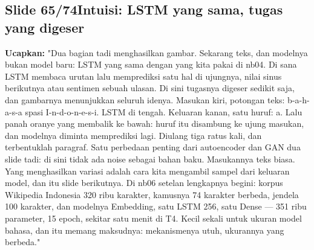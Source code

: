 \documentclass[11pt]{article}
\renewcommand{\framebox}[1]{\colorbox{acc!15}{\textcolor{acc}{\textbf{#1}}}}
\begin{document}
\subsection*{\framebox{Slide 65/74}\quad Intuisi: LSTM yang sama, tugas yang digeser}
\textbf{Ucapkan:} "Dua bagian tadi menghasilkan gambar. Sekarang teks, dan modelnya bukan model baru: LSTM yang sama dengan yang kita pakai di nb04. Di sana LSTM membaca urutan lalu memprediksi satu hal di ujungnya, nilai sinus berikutnya atau sentimen sebuah ulasan. Di sini tugasnya digeser sedikit saja, dan gambarnya menunjukkan seluruh idenya. Masukan kiri, potongan teks: b-a-h-a-s-a spasi I-n-d-o-n-e-s-i. LSTM di tengah. Keluaran kanan, satu huruf: a. Lalu panah oranye yang membalik ke bawah: huruf itu disambung ke ujung masukan, dan modelnya diminta memprediksi lagi. Diulang tiga ratus kali, dan terbentuklah paragraf. Satu perbedaan penting dari autoencoder dan GAN dua slide tadi: di sini tidak ada noise sebagai bahan baku. Masukannya teks biasa. Yang menghasilkan variasi adalah cara kita mengambil sampel dari keluaran model, dan itu slide berikutnya. Di nb06 setelan lengkapnya begini: korpus Wikipedia Indonesia 320 ribu karakter, kamusnya 74 karakter berbeda, jendela 100 karakter, dan modelnya Embedding, satu LSTM 256, satu Dense --- 351 ribu parameter, 15 epoch, sekitar satu menit di T4. Kecil sekali untuk ukuran model bahasa, dan itu memang maksudnya: mekanismenya utuh, ukurannya yang berbeda."\\[2pt]
\end{document}

